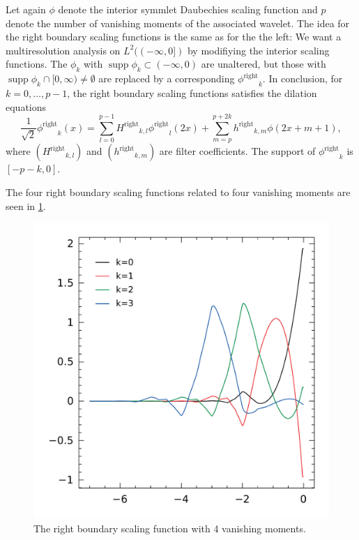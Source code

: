 \documentclass[a4paper]{scrartcl}
\newcommand\rphi{\ensuremath{\phi^{\text{right}}}}
\newcommand\rH{\ensuremath{H^{\text{right}}}}
\newcommand\rh{\ensuremath{h^{\text{right}}}}
\DeclareMathOperator\supp{supp}
\begin{document}
Let again $\phi$ denote the interior symmlet Daubechies scaling function and $p$ denote the number of vanishing moments of the associated wavelet.
The idea for the right boundary scaling functions is the same as for the the left:
We want a multiresolution analysis on $L^2((-\infty,0])$ by modifiying the interior scaling functions.
The $\phi_k$ with $\supp\phi_k \subset (-\infty,0)$ are unaltered, but those with $\supp\phi_k \cap [0, \infty) \neq \emptyset$ are replaced by a corresponding $\rphi_k$.
In conclusion, for $k=0,\ldots,p-1$, the right boundary scaling functions satisfies the dilation equations
\begin{equation}
	\label{eq:right_scaling_function_definition}
	\frac1{\sqrt2} \rphi_k(x)
	= \sum_{l=0}^{p-1} \rH_{k,l} \rphi_l(2x) + \sum_{m=p}^{p+2k} \rh_{k,m} \phi(2x+m+1),
\end{equation}
where $(\rH_{k,l})$ and $(\rh_{k,m})$ are filter coefficients.
The support of $\rphi_k$ is $[-p-k,0]$.

The four right boundary scaling functions related to four vanishing moments are seen in \cref{fig:right_Daubechies4}.

\begin{figure}
	\centering
	\includegraphics[scale=0.5]{right}
	\caption{The right boundary scaling function with 4 vanishing moments.}
	\label{fig:right_Daubechies4}
\end{figure}


\printbibliography
\end{document}
